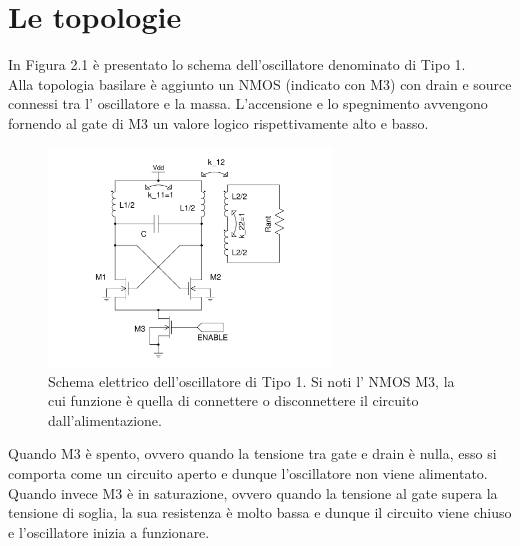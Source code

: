 \documentclass[a4paper, 12pt]{memoir}
\begin{document}
\section{Le topologie}
In Figura 2.1 è presentato lo schema dell'oscillatore denominato di Tipo 1.\\
Alla topologia basilare è aggiunto un NMOS (indicato con M3) con
drain e source connessi tra l' oscillatore e la massa. L'accensione e lo
spegnimento avvengono fornendo al gate di M3 un valore logico rispettivamente
alto e basso.\\
\begin{figure}[h]
\centering
\includegraphics[width=0.67\textwidth]{images/tipo1.pdf}
\caption{Schema elettrico dell'oscillatore di Tipo 1. Si noti l' NMOS M3, la
      cui funzione è quella di connettere o disconnettere il circuito
	dall'alimentazione.}
\end{figure}
Quando M3 è spento, ovvero quando la tensione tra gate e drain è
nulla, esso si comporta come un circuito aperto e dunque l'oscillatore non
viene alimentato. Quando invece M3 è in saturazione, ovvero quando la tensione 
al gate supera la tensione di soglia, la sua resistenza è molto bassa e dunque 
il circuito viene chiuso e l'oscillatore inizia a funzionare.
\end{document}
